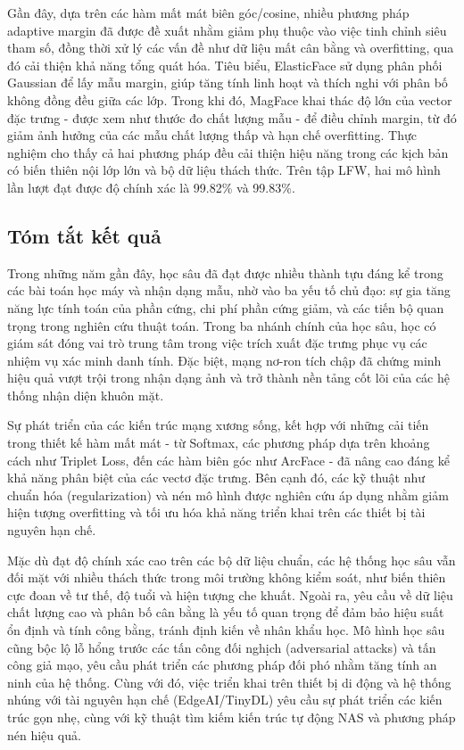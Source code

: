 Gần đây, dựa trên các hàm mất mát biên góc/cosine, nhiều phương pháp adaptive margin đã được đề xuất nhằm giảm phụ thuộc vào việc tinh chỉnh siêu tham số, đồng thời xử lý các vấn đề như dữ liệu mất cân bằng và overfitting, qua đó cải thiện khả năng tổng quát hóa. Tiêu biểu, ElasticFace \cite{5_Boutros_2022_CVPR} sử dụng phân phối Gaussian để lấy mẫu margin, giúp tăng tính linh hoạt và thích nghi với phân bố không đồng đều giữa các lớp. Trong khi đó, MagFace \cite{23_meng_2021_magface} khai thác độ lớn của vector đặc trưng - được xem như thước đo chất lượng mẫu - để điều chỉnh margin, từ đó giảm ảnh hưởng của các mẫu chất lượng thấp và hạn chế overfitting. Thực nghiệm cho thấy cả hai phương pháp đều cải thiện hiệu năng trong các kịch bản có biến thiên nội lớp lớn và bộ dữ liệu thách thức. Trên tập LFW, hai mô hình lần lượt đạt được độ chính xác là 99.82\% và 99.83\%.
\subsection{Tóm tắt kết quả}
Trong những năm gần đây, học sâu đã đạt được nhiều thành tựu đáng kể trong các bài toán học máy và nhận dạng mẫu, nhờ vào ba yếu tố chủ đạo: sự gia tăng năng lực tính toán của phần cứng, chi phí phần cứng giảm, và các tiến bộ quan trọng trong nghiên cứu thuật toán. Trong ba nhánh chính của học sâu, học có giám sát đóng vai trò trung tâm trong việc trích xuất đặc trưng phục vụ các nhiệm vụ xác minh danh tính. Đặc biệt, mạng nơ-ron tích chập đã chứng minh hiệu quả vượt trội trong nhận dạng ảnh và trở thành nền tảng cốt lõi của các hệ thống nhận diện khuôn mặt\cite{2_electronics9081188}.

Sự phát triển của các kiến trúc mạng xương sống, kết hợp với những cải tiến trong thiết kế hàm mất mát - từ Softmax, các phương pháp dựa trên khoảng cách như Triplet Loss, đến các hàm biên góc như ArcFace - đã nâng cao đáng kể khả năng phân biệt của các vectơ đặc trưng\cite{20_WANG2021215,23_meng_2021_magface}. Bên cạnh đó, các kỹ thuật như chuẩn hóa (regularization) và nén mô hình được nghiên cứu áp dụng nhằm giảm hiện tượng overfitting và tối ưu hóa khả năng triển khai trên các thiết bị tài nguyên hạn chế\cite{27_alzubaidi_2021_review}.

Mặc dù đạt độ chính xác cao trên các bộ dữ liệu chuẩn, các hệ thống học sâu vẫn đối mặt với nhiều thách thức trong môi trường không kiểm soát, như biến thiên cực đoan về tư thế, độ tuổi và hiện tượng che khuất\cite{18_s25051410,2_electronics9081188,sota_GUO2019102805}. Ngoài ra, yêu cầu về dữ liệu chất lượng cao và phân bố cân bằng là yếu tố quan trọng để đảm bảo hiệu suất ổn định và tính công bằng, tránh định kiến về nhân khẩu học. Mô hình học sâu cũng bộc lộ lỗ hổng trước các tấn công đối nghịch (adversarial attacks) và tấn công giả mạo, yêu cầu phát triển các phương pháp đối phó nhằm tăng tính an ninh của hệ thống\cite{18_s25051410,20_WANG2021215}. Cùng với đó, việc triển khai trên thiết bị di động và hệ thống nhúng với tài nguyên hạn chế (EdgeAI/TinyDL) yêu cầu sự phát triển các kiến trúc gọn nhẹ, cùng với kỹ thuật tìm kiếm kiến trúc tự động NAS và phương pháp nén hiệu quả\cite{14_10.1145/3776588,27_alzubaidi_2021_review,20_WANG2021215}.

